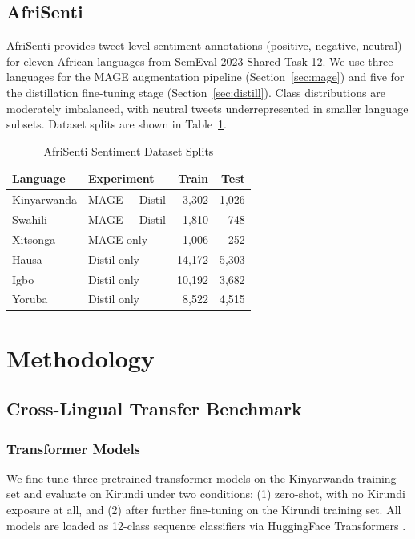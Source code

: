 \documentclass[conference]{IEEEtran}
\begin{document}
\subsection{AfriSenti}
AfriSenti \cite{b_adelani_afrisenti} provides tweet-level sentiment
annotations (positive, negative, neutral) for eleven African languages
from SemEval-2023 Shared Task 12. We use three languages for the MAGE
augmentation pipeline (Section~\ref{sec:mage}) and five for the
distillation fine-tuning stage (Section~\ref{sec:distill}). Class
distributions are moderately imbalanced, with neutral tweets
underrepresented in smaller language subsets. Dataset splits are shown
in Table~\ref{tab:data_sent}.

\begin{table}[htbp]
\caption{AfriSenti Sentiment Dataset Splits}
\label{tab:data_sent}
\begin{center}
\small
\begin{tabular}{llrr}
\toprule
\textbf{Language} & \textbf{Experiment} & \textbf{Train} & \textbf{Test} \\
\midrule
Kinyarwanda & MAGE + Distil & 3,302  & 1,026 \\
Swahili     & MAGE + Distil & 1,810  &   748 \\
Xitsonga    & MAGE only     & 1,006  &   252 \\
Hausa       & Distil only   & 14,172 & 5,303 \\
Igbo        & Distil only   & 10,192 & 3,682 \\
Yoruba      & Distil only   &  8,522 & 4,515 \\
\bottomrule
\end{tabular}
\end{center}
\end{table}

\section{Methodology}\label{sec:method}

\subsection{Cross-Lingual Transfer Benchmark}\label{sec:xlt}

\subsubsection{Transformer Models}
We fine-tune three pretrained transformer models on the Kinyarwanda
training set and evaluate on Kirundi under two conditions: (1) zero-shot,
with no Kirundi exposure at all, and (2) after further fine-tuning on the
Kirundi training set. All models are loaded as 12-class sequence
classifiers via HuggingFace Transformers \cite{b_wolf}.
\end{document}
